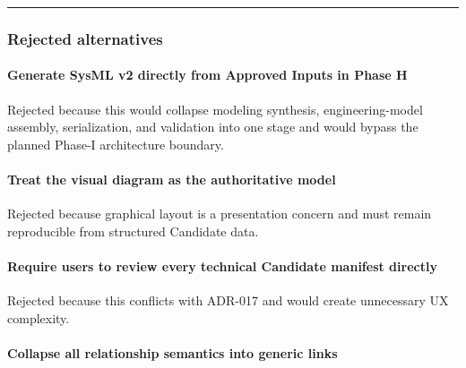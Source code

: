 \begin{center}\rule{0.5\linewidth}{0.5pt}\end{center}

\hypertarget{rejected-alternatives-2}{%
\subsubsection{Rejected alternatives}\label{rejected-alternatives-2}}

\hypertarget{generate-sysml-v2-directly-from-approved-inputs-in-phase-h}{%
\paragraph{Generate SysML v2 directly from Approved Inputs in Phase H}\label{generate-sysml-v2-directly-from-approved-inputs-in-phase-h}}

Rejected because this would collapse modeling synthesis, engineering-model assembly, serialization, and validation into one stage and would bypass the planned Phase-I architecture boundary.

\hypertarget{treat-the-visual-diagram-as-the-authoritative-model}{%
\paragraph{Treat the visual diagram as the authoritative model}\label{treat-the-visual-diagram-as-the-authoritative-model}}

Rejected because graphical layout is a presentation concern and must remain reproducible from structured Candidate data.

\hypertarget{require-users-to-review-every-technical-candidate-manifest-directly}{%
\paragraph{Require users to review every technical Candidate manifest directly}\label{require-users-to-review-every-technical-candidate-manifest-directly}}

Rejected because this conflicts with ADR-017 and would create unnecessary UX complexity.

\hypertarget{collapse-all-relationship-semantics-into-generic-links}{%
\paragraph{Collapse all relationship semantics into generic links}\label{collapse-all-relationship-semantics-into-generic-links}}

